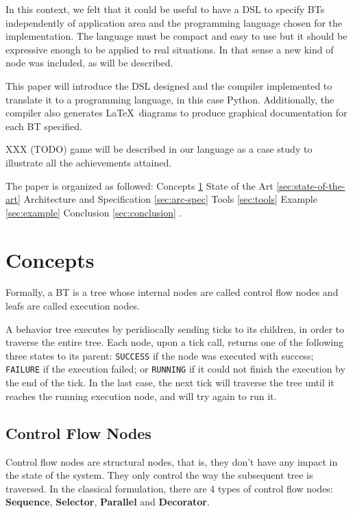 \documentclass[a4paper,UKenglish,cleveref, autoref, thm-restate]{oasics-v2019}
\begin{document}
In this context, we felt that it could be useful to have a DSL to specify BTs independently of application area and the programming language chosen for the implementation.
The language must be compact and easy to use but it should be expressive enough to be applied to real situations.
In that sense a new kind of node was included, as will be described.

This paper will introduce the DSL designed and the compiler implemented to translate it to a programming language, in this case Python.
Additionally, the compiler also generates \LaTeX\ diagrams to produce graphical documentation for each BT specified.

XXX (TODO) game will be described in our language as a case study to illustrate all the achievements attained.

The paper is organized as followed: Concepts \ref{sec:concepts} State of the Art \ref{sec:state-of-the-art} Architecture and Specification \ref{sec:arc-spec} Tools \ref{sec:tools} Example \ref{sec:example} Conclusion \ref{sec:conclusion} .


\section{Concepts}
\label{sec:concepts}
Formally, a BT is a tree whose internal nodes are called control flow nodes and leafs are called execution nodes.

A behavior tree executes by peridiocally sending ticks to its children, in order to traverse the entire tree.
Each node, upon a tick call, returns one of the following three states to its parent: \texttt{SUCCESS} if the node was executed with success; \texttt{FAILURE} if the execution failed; or \texttt{RUNNING} if it could not finish the execution by the end of the tick.
In the last case, the next tick will traverse the tree until it reaches the running execution node, and will try again to run it.

\subsection{Control Flow Nodes}
Control flow nodes are structural nodes, that is, they don't have any impact in the state of the system. They only control the way the subsequent tree is traversed.
In the classical formulation, there are 4 types of control flow nodes: \textbf{Sequence}, \textbf{Selector}, \textbf{Parallel} and \textbf{Decorator}.
\end{document}
